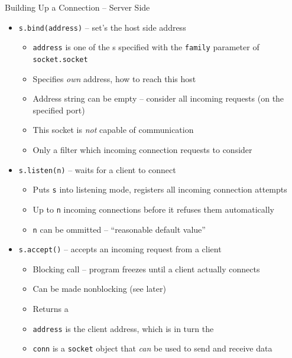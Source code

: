 \begin{frame}{Building Up a Connection -- Server Side}
%
\begin{itemize}
\item \texttt{s.bind(address)} -- set's the host side address
	\begin{itemize}
	\item \texttt{address} is one of the s specified with the \texttt{family} parameter of \texttt{socket.socket}
	\item Specifies \emph{own} address, \ie how to reach this host
	\item Address string can be empty -- consider all incoming requests (on the specified port)
	\item This socket is \emph{not} capable of communication
	\item Only a filter which incoming connection requests to consider
	\end{itemize}
\pause
\item \texttt{s.listen(n)} -- waits for a client to connect
	\begin{itemize}
	\item Puts \texttt{s} into listening mode, \ie registers all incoming connection attempts
	\item Up to \texttt{n} incoming connections before it refuses them automatically
	\item \texttt{n} can be ommitted -- \enquote{reasonable default value}
	\end{itemize}
\pause
\item \texttt{s.accept()} -- accepts an incoming request from a client
	\begin{itemize}
	\item Blocking call -- program freezes until a client actually connects
	\item Can be made nonblocking (see later)
	\item Returns a 
	\item \texttt{address} is the client address, which is in turn the 
	\item \texttt{conn} is a \texttt{socket} object that \emph{can} be used to send and receive data
	\end{itemize}
\end{itemize}
%
\end{frame}



